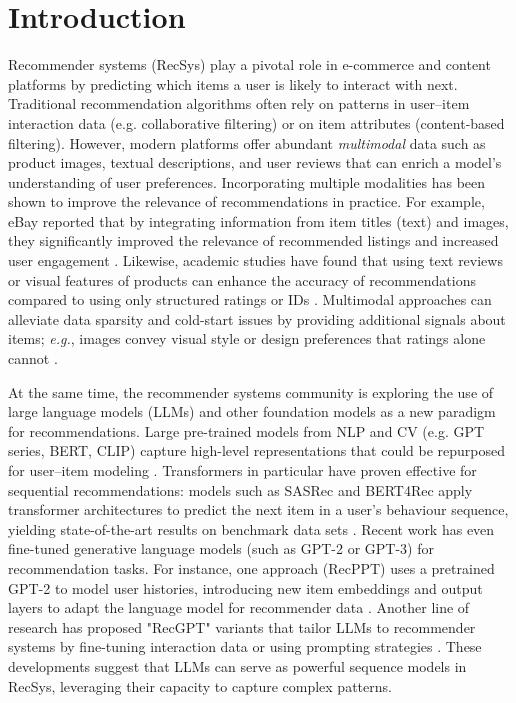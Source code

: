 \documentclass[conference]{IEEEtran}
\begin{document}

\section{Introduction}
Recommender systems (RecSys) play a pivotal role in e-commerce and content platforms by predicting which items a user is likely to interact with next. Traditional recommendation algorithms often rely on patterns in user–item interaction data (e.g. collaborative filtering) or on item attributes (content-based filtering). However, modern platforms offer abundant \textit{multimodal} data such as product images, textual descriptions, and user reviews that can enrich a model’s understanding of user preferences. Incorporating multiple modalities has been shown to improve the relevance of recommendations in practice. For example, eBay reported that by integrating information from item titles (text) and images, they significantly improved the relevance of recommended listings and increased user engagement \cite{b4}. Likewise, academic studies have found that using text reviews or visual features of products can enhance the accuracy of recommendations compared to using only structured ratings or IDs \cite{b5}. Multimodal approaches can alleviate data sparsity and cold-start issues by providing additional signals about items; \textit{e.g.}, images convey visual style or design preferences that ratings alone cannot \cite{b5}.


At the same time, the recommender systems community is exploring the use of large language models (LLMs) and other foundation models as a new paradigm for recommendations.  Large pre-trained models from NLP and CV (e.g. GPT series, BERT, CLIP) capture high-level representations that could be repurposed for user–item modeling \cite{b6}. Transformers in particular have proven effective for sequential recommendations: models such as SASRec and BERT4Rec apply transformer architectures to predict the next item in a user's behaviour sequence, yielding state-of-the-art results on benchmark data sets \cite{b7}. Recent work has even fine-tuned generative language models (such as GPT-2 or GPT-3) for recommendation tasks. For instance, one approach (RecPPT) uses a pretrained GPT-2 to model user histories, introducing new item embeddings and output layers to adapt the language model for recommender data \cite{b8}. Another line of research has proposed "RecGPT" variants that tailor LLMs to recommender systems by fine-tuning interaction data or using prompting strategies \cite{b9}.  These developments suggest that LLMs can serve as powerful sequence models in RecSys, leveraging their capacity to capture complex patterns. 
\end{document}
